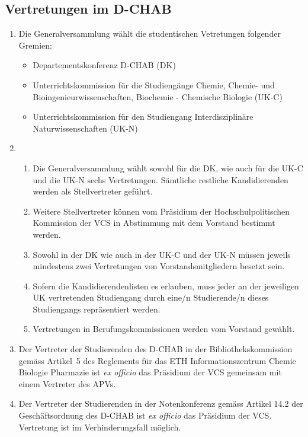 \subsection{Vertretungen im D-CHAB}
\begin{enumerate}
\item Die Generalversammlung wählt die studentischen Vetretungen folgender Gremien:
	\begin{itemize}
	\item Departementskonferenz D-CHAB (DK)
	\item Unterrichtskommission für die Studiengänge Chemie, Chemie- und Bioingenieurwissenschaften, Biochemie - Chemische Biologie (UK-C)
	\item Unterrichtskommission für den Studiengang Interdisziplinäre Naturwissenschaften (UK-N)
	\end{itemize}
\item
	\begin{enumerate}
	\item Die Generalversammlung wählt sowohl für die DK, wie auch für die UK-C und die UK-N sechs Vertretungen. Sämtliche restliche Kandidierenden werden als Stellvertreter geführt.
	\item Weitere Stellvertreter können vom Präsidium der Hochschulpolitischen Kommission der VCS in Abstimmung mit dem Vorstand bestimmt werden.
	\item Sowohl in der DK wie auch in der UK-C und der UK-N müssen jeweils mindestens zwei Vertretungen von Vorstandsmitgliedern besetzt sein.
	\item Sofern die Kandidierendenlisten es erlauben, muss jeder an der jeweiligen UK vertretenden Studiengang durch eine/n Studierende/n dieses Studiengangs repräsentiert werden.
	\item Vertretungen in Berufungskommissionen werden vom Vorstand gewählt.
	\end{enumerate}
\item Der Vertreter der Studierenden des D-CHAB in der Bibliothekskommission gemäss Artikel~5 des Reglements für das ETH Informationszentrum Chemie Biologie Pharmazie ist \textit{ex officio} das Präsidium der VCS gemeinsam mit einem Vertreter des APVs.
\item Der Vertreter der Studierenden in der Notenkonferenz gemäss Artikel 14.2 der Geschäftsordnung des D-CHAB ist \textit{ex officio} das Präsidium der VCS. Vertretung ist im Verhinderungsfall möglich.
\end{enumerate}

